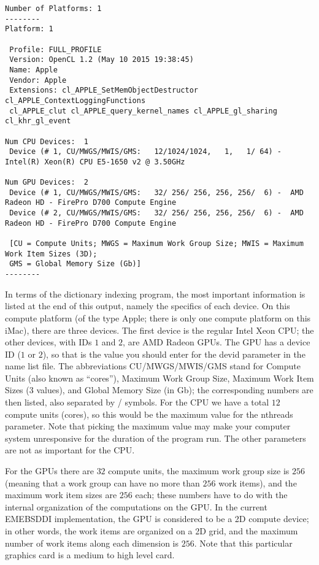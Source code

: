 \documentclass[DIV=calc, paper=letter, fontsize=11pt]{scrartcl}	 %
\begin{document}
{\footnotesize\begin{verbatim}
Number of Platforms: 1
--------
Platform: 1

 Profile: FULL_PROFILE
 Version: OpenCL 1.2 (May 10 2015 19:38:45)
 Name: Apple
 Vendor: Apple
 Extensions: cl_APPLE_SetMemObjectDestructor cl_APPLE_ContextLoggingFunctions 
 cl_APPLE_clut cl_APPLE_query_kernel_names cl_APPLE_gl_sharing cl_khr_gl_event

Num CPU Devices:  1
 Device (# 1, CU/MWGS/MWIS/GMS:   12/1024/1024,   1,   1/ 64) -  Intel(R) Xeon(R) CPU E5-1650 v2 @ 3.50GHz

Num GPU Devices:  2
 Device (# 1, CU/MWGS/MWIS/GMS:   32/ 256/ 256, 256, 256/  6) -  AMD Radeon HD - FirePro D700 Compute Engine
 Device (# 2, CU/MWGS/MWIS/GMS:   32/ 256/ 256, 256, 256/  6) -  AMD Radeon HD - FirePro D700 Compute Engine
  
 [CU = Compute Units; MWGS = Maximum Work Group Size; MWIS = Maximum Work Item Sizes (3D); 
 GMS = Global Memory Size (Gb)]
--------
\end{verbatim}}

In terms of the dictionary indexing program, the most important information is listed at the end of this output, namely
the specifics of each device.  On this compute platform (of the type \textsf{Apple}; there is only one compute platform on 
this iMac), there are three devices.  The first device is the regular Intel Xeon CPU; the other devices, with IDs $1$ and $2$, are 
AMD Radeon GPUs.  The GPU has a device ID ($1$ or $2$), so that is the value you should enter for the \textsf{devid} parameter in the
name list file.  The abbreviations \textsf{CU/MWGS/MWIS/GMS} stand for Compute Units (also known as ``cores''), Maximum
Work Group Size, Maximum Work Item Sizes (3 values), and Global Memory Size (in Gb); the corresponding numbers are then listed, also separated by \textsf{/}
symbols.  For the CPU we have a total $12$ compute units (cores), so this would be the maximum value for the \textsf{nthreads} parameter.
Note that picking the maximum value may make your computer system unresponsive for the duration of the program run. The other parameters
are not as important for the CPU.

For the GPUs there are $32$ compute units, the maximum work group size is $256$ (meaning that a work group can have no more than $256$ work items),
and the maximum work item sizes are $256$ each; these numbers have to do with the internal organization of the computations on the GPU. 
In the current \textsf{EMEBSDDI} implementation, the GPU is considered to be a 2D compute device; in other words, the 
work items are organized on a 2D grid, and the maximum number of work items along each dimension is $256$.  Note that this particular graphics card 
is a medium to high level card.
\end{document}
